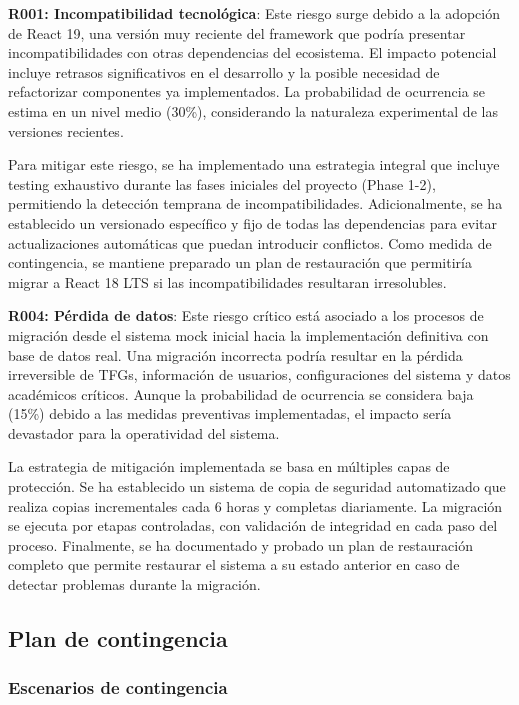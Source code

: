 \documentclass[12pt,a4paper,oneside]{report}
\begin{document}
\textbf{R001: Incompatibilidad tecnológica}: Este riesgo surge debido a la adopción de React 19, una versión muy reciente del framework que podría presentar incompatibilidades con otras dependencias del ecosistema. El impacto potencial incluye retrasos significativos en el desarrollo y la posible necesidad de refactorizar componentes ya implementados. La probabilidad de ocurrencia se estima en un nivel medio (30\%), considerando la naturaleza experimental de las versiones recientes.

Para mitigar este riesgo, se ha implementado una estrategia integral que incluye testing exhaustivo durante las fases iniciales del proyecto (Phase 1-2), permitiendo la detección temprana de incompatibilidades. Adicionalmente, se ha establecido un versionado específico y fijo de todas las dependencias para evitar actualizaciones automáticas que puedan introducir conflictos. Como medida de contingencia, se mantiene preparado un plan de restauración que permitiría migrar a React 18 LTS si las incompatibilidades resultaran irresolubles.

\textbf{R004: Pérdida de datos}: Este riesgo crítico está asociado a los procesos de migración desde el sistema mock inicial hacia la implementación definitiva con base de datos real. Una migración incorrecta podría resultar en la pérdida irreversible de TFGs, información de usuarios, configuraciones del sistema y datos académicos críticos. Aunque la probabilidad de ocurrencia se considera baja (15\%) debido a las medidas preventivas implementadas, el impacto sería devastador para la operatividad del sistema.

La estrategia de mitigación implementada se basa en múltiples capas de protección. Se ha establecido un sistema de copia de seguridad automatizado que realiza copias incrementales cada 6 horas y completas diariamente. La migración se ejecuta por etapas controladas, con validación de integridad en cada paso del proceso. Finalmente, se ha documentado y probado un plan de restauración completo que permite restaurar el sistema a su estado anterior en caso de detectar problemas durante la migración.

\subsection{Plan de contingencia}\label{plan-de-contingencia}

\subsubsection{Escenarios de
contingencia}\label{escenarios-de-contingencia}
\end{document}
